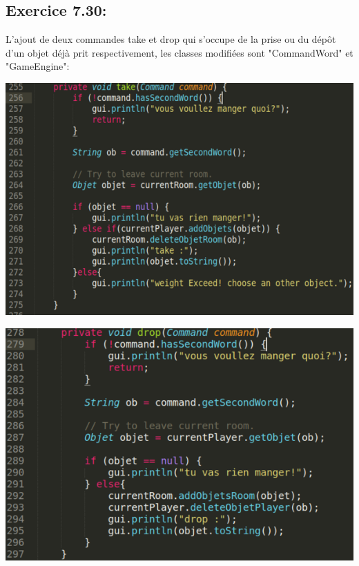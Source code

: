 \documentclass[french,10pt,a4paper]{report}
\begin{document}
\subsection{\textcolor{bb}{Exercice 7.30:}}
L’ajout de deux commandes take et drop qui s’occupe de la  prise ou du dépôt d’un objet  déjà prit  respectivement, les classes modifiées  sont "CommandWord" et "GameEngine":
\begin{center}
	\begin{minipage}{0.4 \textwidth}
		\begin{flushleft}
			\includegraphics[scale=0.23]{captures/it3_3.png}
		\end{flushleft}
	\end{minipage}
	\begin{minipage}{0.4 \textwidth}
		\begin{flushright}
			\includegraphics[scale=0.23]{captures/it3_4.png}
		\end{flushright}
	\end{minipage}
\end{center}
\end{document}
